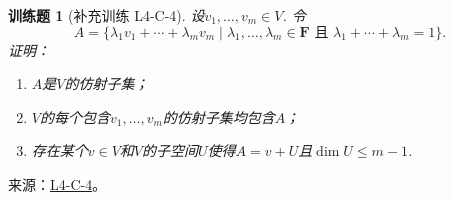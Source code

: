 \documentclass[12pt,fontset=fandol]{ctexart}
\newtheorem{exercise}{训练题}[section]
\begin{document}
\begin{exercise}[补充训练 L4-C-4]\label{prob:L4-C-4}
设$v_1,\ldots,v_m\in V$. 令
        \[A=\{\lambda_1v_1+\cdots+\lambda_mv_m \mid \lambda_1,\ldots,\lambda_m\in\mathbf{F}\text{~且~}\lambda_1+\cdots+\lambda_m=1\}.\]
        证明：
        \begin{enumerate}
            \item $A$是$V$的仿射子集；

            \item $V$的每个包含$v_1,\ldots,v_m$的仿射子集均包含$A$；

            \item 存在某个$v\in V$和$V$的子空间$U$使得$A=v+U$且$\dim U\leqslant m-1$.
        \end{enumerate}
\end{exercise}
\noindent 来源：\href{https://github.com/yhwu-is/Linear-Algebra-Left-Undone/blob/new/%E8%AE%B2%E4%B9%89/%E4%B8%93%E9%A2%98/4%20%E7%BA%BF%E6%80%A7%E7%A9%BA%E9%97%B4%E7%9A%84%E8%BF%90%E7%AE%97.tex}{L4-C-4}。
\end{document}
